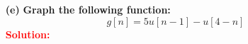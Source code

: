 \documentclass[a4paper, 12pt]{article}
\begin{document}
\begin{itemize}
\begin{itemize}
\pagebreak
\item[\textbf{(e)}]{\textbf{Graph the following function:}}
\begin{equation}
g[n] = 5 u[n - 1] - u [4 - n]
\end{equation}
\textcolor{red}{\textbf{Solution:}}
\begin{figure}[h!]
\end{figure}
\end{itemize}
\end{itemize}
\end{document}
